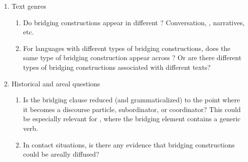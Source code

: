 \documentclass[output=paper]{LSP/langsci}
\begin{document}
\begin{enumerate}
\item  Text genres
\begin{enumerate}
\item  Do bridging constructions appear in different ?
Conversation, , narratives, etc.
\item  For languages with different types of bridging constructions, does the same type of bridging construction appear across ? Or are there different types of bridging constructions associated with different texts?
\end{enumerate}

\item   Historical and areal questions
\begin{enumerate}
\item  Is the bridging clause reduced (and grammaticalized) to the point where it becomes a discourse particle, subordinator, or coordinator? This could be especially relevant for , where the bridging element contains a generic verb.
\item   In contact situations, is there any evidence that bridging constructions could be areally diffused?
\end{enumerate}
\end{enumerate}
\end{document}
